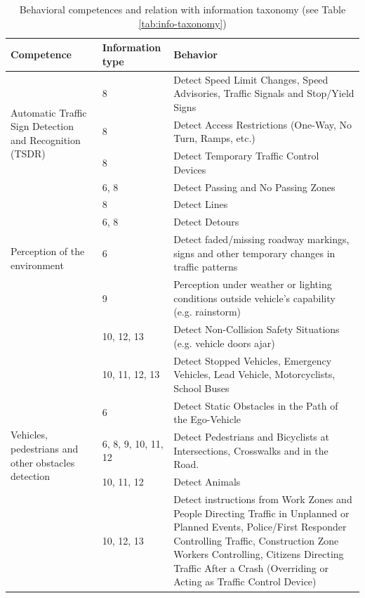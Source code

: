 \documentclass[journal]{IEEEtran}
\begin{document}
\begin{table}[t] %
	\caption{Behavioral competences and relation with information taxonomy 
		(see Table \ref{tab:info-taxonomy})}
	\label{tab:behavioral-competences}
	\begin{tabular*}{\textwidth}{m{4cm} l p{11cm}}%
		\hline %
		\textbf{Competence}	& \textbf{Information type} & \textbf{Behavior}	
		\\
		\hline %
		\multirow{4}{4cm}{Automatic Traffic Sign Detection
			and Recognition (TSDR)}
		& 8    & Detect Speed Limit Changes, Speed Advisories, Traffic Signals 
		and Stop/Yield Signs \\
		& 8    & Detect Access Restrictions (One-Way, No Turn, Ramps, etc.) \\
		& 8    & Detect Temporary Traffic Control Devices \\
		& 6, 8 & Detect Passing and No Passing Zones  \\
		\hline %
		\multirow{4}{*}{Perception of the environment}
		& 8 & Detect Lines \\
		& 6, 8 & Detect Detours  \\
		& 6 & Detect faded/missing roadway markings, signs and other 
		temporary changes in traffic patterns \\
		& 9 & Perception under weather or lighting conditions 
		outside 
		vehicle’s capability (e.g. rainstorm) \\
		\hline %
		\multirow{6}{4cm}{Vehicles, pedestrians and other obstacles 
			detection}
		& 10, 12, 13 & Detect Non-Collision Safety Situations (e.g. vehicle 
		doors ajar) \\
		& 10, 11, 12, 13 & Detect Stopped Vehicles, Emergency Vehicles, Lead 
		Vehicle, Motorcyclists, School Buses \\
		& 6  & Detect Static Obstacles in the Path of the Ego-Vehicle \\
		& 6, 8, 9, 10, 11, 12 & Detect Pedestrians and Bicyclists at 
		Intersections, Crosswalks and in the Road. \\
		& 10, 11, 12 & Detect Animals \\
		& 10, 12, 13 & Detect instructions from Work Zones and People 
		Directing Traffic in Unplanned or Planned Events, Police/First 
		Responder Controlling Traffic, Construction Zone Workers Controlling, 
		Citizens Directing Traffic After a Crash (Overriding or Acting as 
		Traffic Control Device) \\
		
		\hline %
	\end{tabular*}
\end{table}
\end{document}
